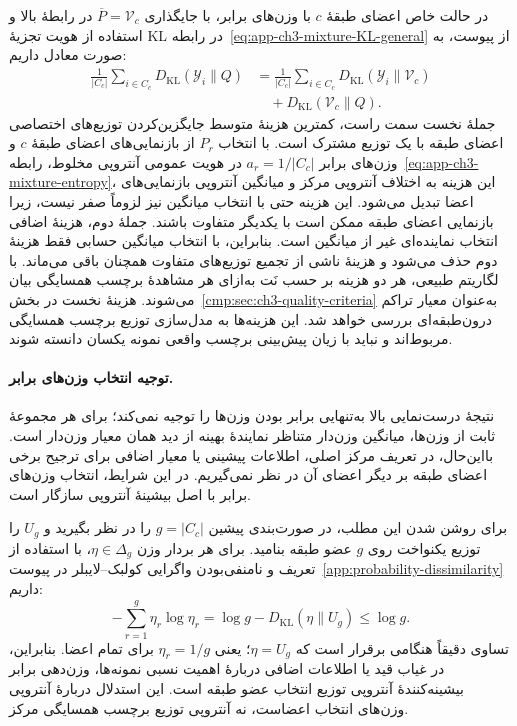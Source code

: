 در حالت خاص اعضای طبقهٔ $c$ با وزن‌های برابر، با جایگذاری
$\overline P=\mathcal V_c$ در رابطهٔ بالا و استفاده از
هویت تجزیهٔ KL در رابطه~\eqref{eq:app-ch3-mixture-KL-general}
از پیوست، به صورت معادل داریم:
\begin{equation}\label{cmp:eq:ch3-center-excess-average-kl}
\boxed{
\begin{aligned}
\frac{1}{|C_c|}\sum_{i\in C_c}
D_{\mathrm{KL}}(\mathscr Y_i\|Q)
&=\frac{1}{|C_c|}\sum_{i\in C_c}
D_{\mathrm{KL}}(\mathscr Y_i\|\mathcal V_c)\\
&\quad+D_{\mathrm{KL}}(\mathcal V_c\|Q).
\end{aligned}
}
\end{equation}
جملهٔ نخست سمت راست، کمترین هزینهٔ متوسط جایگزین‌کردن
توزیع‌های اختصاصی اعضای طبقه با یک توزیع مشترک است.
با انتخاب $P_r$ از بازنمایی‌های اعضای طبقهٔ $c$ و
وزن‌های برابر $a_r=1/|C_c|$ در هویت عمومی آنتروپی
مخلوط، رابطه~\eqref{eq:app-ch3-mixture-entropy}،
این هزینه به اختلاف آنتروپی مرکز و میانگین آنتروپی
بازنمایی‌های اعضا تبدیل می‌شود.
این هزینه حتی با انتخاب میانگین نیز لزوماً صفر نیست،
زیرا بازنمایی اعضای طبقه ممکن است با یکدیگر متفاوت باشند.
جملهٔ دوم، هزینهٔ اضافی انتخاب نماینده‌ای غیر از میانگین
است. بنابراین، با انتخاب میانگین حسابی فقط هزینهٔ دوم
حذف می‌شود و هزینهٔ ناشی از تجمیع توزیع‌های متفاوت
همچنان باقی می‌ماند. با لگاریتم طبیعی، هر دو هزینه بر
حسب نَت به‌ازای هر مشاهدهٔ برچسب همسایگی بیان می‌شوند.
هزینهٔ نخست در بخش~\ref{cmp:sec:ch3-quality-criteria}
به‌عنوان معیار تراکم درون‌طبقه‌ای بررسی خواهد شد.
این هزینه‌ها به مدل‌سازی توزیع برچسب همسایگی مربوط‌اند
و نباید با زیان پیش‌بینی برچسب واقعی نمونه یکسان دانسته شوند.

\paragraph{توجیه انتخاب وزن‌های برابر.}
نتیجهٔ درست‌نمایی بالا به‌تنهایی برابر بودن وزن‌ها را توجیه
نمی‌کند؛ برای هر مجموعهٔ ثابت از وزن‌ها، میانگین وزن‌دار
متناظر نمایندهٔ بهینه از دید همان معیار وزن‌دار است.
بااین‌حال، در تعریف مرکز اصلی، اطلاعات پیشینی یا معیار
اضافی برای ترجیح برخی اعضای طبقه بر دیگر اعضای آن
در نظر نمی‌گیریم. در این شرایط، انتخاب وزن‌های برابر
با اصل بیشینهٔ آنتروپی سازگار است.

برای روشن شدن این مطلب، در صورت‌بندی پیشین $g=|C_c|$
را در نظر بگیرید و $U_g$ را توزیع یکنواخت روی $g$ عضو
طبقه بنامید. برای هر بردار وزن $\eta\in\Delta_g$،
با استفاده از تعریف و نامنفی‌بودن واگرایی کولبک--لایبلر
در پیوست~\ref{app:probability-dissimilarity} داریم:
\begin{equation}\label{cmp:eq:ch3-center-uniform-weight-entropy}
-\sum_{r=1}^{g}\eta_r\log\eta_r
=\log g-D_{\mathrm{KL}}(\eta\|U_g)
\le\log g.
\end{equation}
تساوی دقیقاً هنگامی برقرار است که $\eta=U_g$؛ یعنی
$\eta_r=1/g$ برای تمام اعضا. بنابراین، در غیاب قید
یا اطلاعات اضافی دربارهٔ اهمیت نسبی نمونه‌ها، وزن‌دهی
برابر بیشینه‌کنندهٔ آنتروپی توزیع انتخاب عضو طبقه است.
این استدلال دربارهٔ آنتروپی وزن‌های انتخاب اعضاست، نه
آنتروپی توزیع برچسب همسایگی مرکز.

